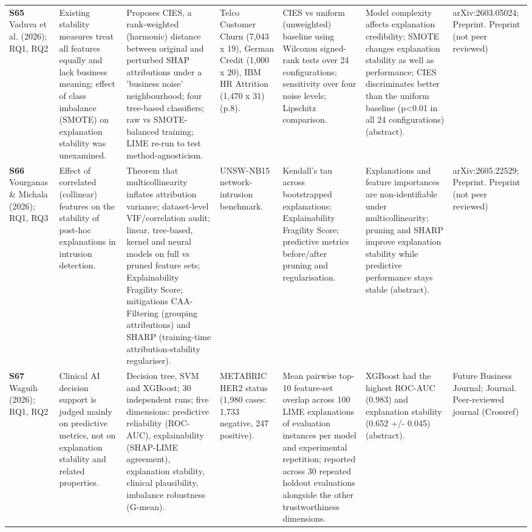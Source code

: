 \begin{longtable}{@{}P{1.55cm}P{2.9cm}P{4.5cm}P{3.2cm}P{3.4cm}P{4.6cm}P{3.6cm}@{}}
\textbf{S65} \cite{S65} Vaduva et al. (2026); RQ1, RQ2 & Existing stability measures treat all features equally and lack business meaning; effect of class imbalance (SMOTE) on explanation stability was unexamined. & Proposes CIES, a rank-weighted (harmonic) distance between original and perturbed SHAP attributions under a 'business noise' neighbourhood; four tree-based classifiers; raw vs SMOTE-balanced training; LIME re-run to test method-agnosticism. & Telco Customer Churn (7,043 x 19), German Credit (1,000 x 20), IBM HR Attrition (1,470 x 31) (p.8). & CIES vs uniform (unweighted) baseline using Wilcoxon signed-rank tests over 24 configurations; sensitivity over four noise levels; Lipschitz comparison. & Model complexity affects explanation credibility; SMOTE changes explanation stability as well as performance; CIES discriminates better than the uniform baseline (p\textless{}0.01 in all 24 configurations) (abstract). & arXiv:2603.05024; Preprint. Preprint (not peer reviewed) \\
\textbf{S66} \cite{S66} Vourganas \& Michala (2026); RQ1, RQ3 & Effect of correlated (collinear) features on the stability of post-hoc explanations in intrusion detection. & Theorem that multicollinearity inflates attribution variance; dataset-level VIF/\allowbreak{}correlation audit; linear, tree-based, kernel and neural models on full vs pruned feature sets; Explainability Fragility Score; mitigations CAA-Filtering (grouping attributions) and SHARP (training-time attribution-stability regulariser). & UNSW-NB15 network-intrusion benchmark. & Kendall's tau across bootstrapped explanations; Explainability Fragility Score; predictive metrics before/\allowbreak{}after pruning and regularisation. & Explanations and feature importances are non-identifiable under multicollinearity; pruning and SHARP improve explanation stability while predictive performance stays stable (abstract). & arXiv:2605.22529; Preprint. Preprint (not peer reviewed) \\
\textbf{S67} \cite{S67} Waguih (2026); RQ1, RQ2 & Clinical AI decision support is judged mainly on predictive metrics, not on explanation stability and related properties. & Decision tree, SVM and XGBoost; 30 independent runs; five dimensions: predictive reliability (ROC-AUC), explainability (SHAP-LIME agreement), explanation stability, clinical plausibility, imbalance robustness (G-mean). & METABRIC HER2 status (1,980 cases: 1,733 negative, 247 positive). & Mean pairwise top-10 feature-set overlap across 100 LIME explanations of evaluation instances per model and experimental repetition; reported across 30 repeated holdout evaluations alongside the other trustworthiness dimensions. & XGBoost had the highest ROC-AUC (0.983) and explanation stability (0.652 +/\allowbreak{}- 0.045) (abstract). & Future Business Journal; Journal. Peer-reviewed journal (Crossref) \\

\end{longtable}
